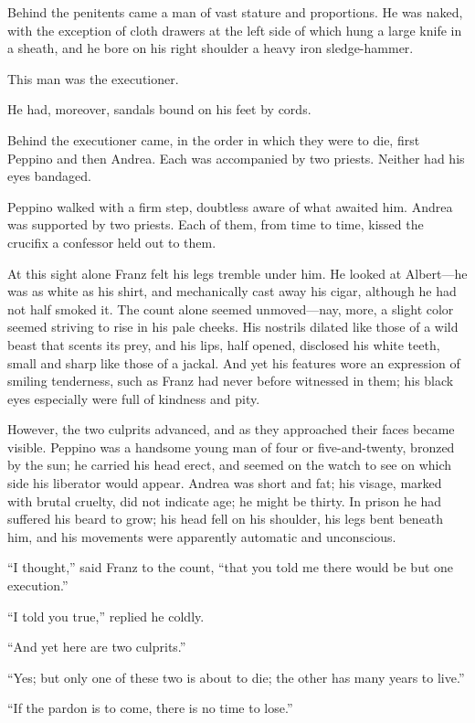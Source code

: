 Behind the penitents came a man of vast stature and proportions. He was
naked, with the exception of cloth drawers at the left side of which
hung a large knife in a sheath, and he bore on his right shoulder a
heavy iron sledge-hammer.

This man was the executioner.

He had, moreover, sandals bound on his feet by cords.

Behind the executioner came, in the order in which they were to die,
first Peppino and then Andrea. Each was accompanied by two priests.
Neither had his eyes bandaged.

Peppino walked with a firm step, doubtless aware of what awaited him.
Andrea was supported by two priests. Each of them, from time to time,
kissed the crucifix a confessor held out to them.

At this sight alone Franz felt his legs tremble under him. He looked at
Albert—he was as white as his shirt, and mechanically cast away his
cigar, although he had not half smoked it. The count alone seemed
unmoved—nay, more, a slight color seemed striving to rise in his pale
cheeks. His nostrils dilated like those of a wild beast that scents its
prey, and his lips, half opened, disclosed his white teeth, small and
sharp like those of a jackal. And yet his features wore an expression
of smiling tenderness, such as Franz had never before witnessed in
them; his black eyes especially were full of kindness and pity.

However, the two culprits advanced, and as they approached their faces
became visible. Peppino was a handsome young man of four or
five-and-twenty, bronzed by the sun; he carried his head erect, and
seemed on the watch to see on which side his liberator would appear.
Andrea was short and fat; his visage, marked with brutal cruelty, did
not indicate age; he might be thirty. In prison he had suffered his
beard to grow; his head fell on his shoulder, his legs bent beneath
him, and his movements were apparently automatic and unconscious.

“I thought,” said Franz to the count, “that you told me there would be
but one execution.”

“I told you true,” replied he coldly.

“And yet here are two culprits.”

“Yes; but only one of these two is about to die; the other has many
years to live.”

“If the pardon is to come, there is no time to lose.”

